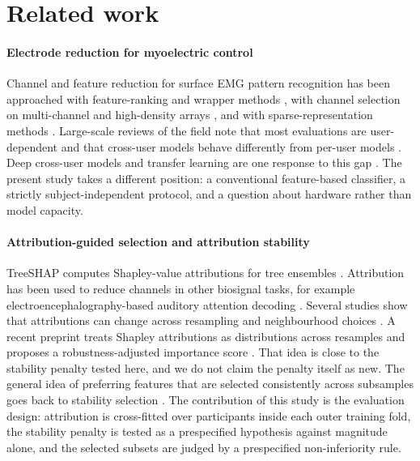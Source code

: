 \section{Related work}
\label{sec:related_work}

\paragraph{Electrode reduction for myoelectric control}
Channel and feature reduction for surface EMG pattern recognition has been approached with feature-ranking and wrapper methods \citep{phinyomark2012feature,liu2014emg}, with channel selection on multi-channel and high-density arrays \citep{altimemy2013classification,stango2015spatial}, and with sparse-representation methods \citep{qu2021reduce}. Large-scale reviews of the field note that most evaluations are user-dependent and that cross-user models behave differently from per-user models \citep{phinyomark2018emg}. Deep cross-user models and transfer learning are one response to this gap \citep{cote2019deep}. The present study takes a different position: a conventional feature-based classifier, a strictly subject-independent protocol, and a question about hardware rather than model capacity.

\paragraph{Attribution-guided selection and attribution stability}
TreeSHAP computes Shapley-value attributions for tree ensembles \citep{lundberg2017unified,lundberg2020local}. Attribution has been used to reduce channels in other biosignal tasks, for example electroencephalography-based auditory attention decoding \citep{salmi2025shapaad}. Several studies show that attributions can change across resampling and neighbourhood choices \citep{visani2022statistical,kelodjou2023shaping}. A recent preprint treats Shapley attributions as distributions across resamples and proposes a robustness-adjusted importance score \citep{xiang2026roshap}. That idea is close to the stability penalty tested here, and we do not claim the penalty itself as new. The general idea of preferring features that are selected consistently across subsamples goes back to stability selection \citep{meinshausen2010stability}. The contribution of this study is the evaluation design: attribution is cross-fitted over participants inside each outer training fold, the stability penalty is tested as a prespecified hypothesis against magnitude alone, and the selected subsets are judged by a prespecified non-inferiority rule.

